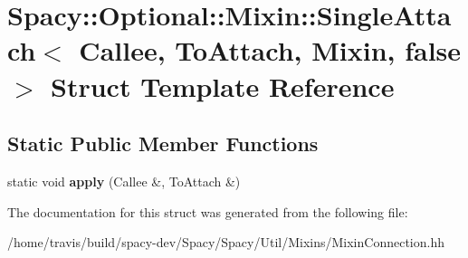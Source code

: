 \hypertarget{structSpacy_1_1Optional_1_1Mixin_1_1SingleAttach_3_01Callee_00_01ToAttach_00_01Mixin_00_01false_01_4}{\section{Spacy\-:\-:Optional\-:\-:Mixin\-:\-:Single\-Attach$<$ Callee, To\-Attach, Mixin, false $>$ Struct Template Reference}
\label{structSpacy_1_1Optional_1_1Mixin_1_1SingleAttach_3_01Callee_00_01ToAttach_00_01Mixin_00_01false_01_4}
}
\subsection*{Static Public Member Functions}
\begin{DoxyCompactItemize}
\item 
\hypertarget{structSpacy_1_1Optional_1_1Mixin_1_1SingleAttach_3_01Callee_00_01ToAttach_00_01Mixin_00_01false_01_4_a92ac7afd81a8e070f3b5da787b0c177e}{static void {\bfseries apply} (Callee \&, To\-Attach \&)}\label{structSpacy_1_1Optional_1_1Mixin_1_1SingleAttach_3_01Callee_00_01ToAttach_00_01Mixin_00_01false_01_4_a92ac7afd81a8e070f3b5da787b0c177e}

\end{DoxyCompactItemize}


The documentation for this struct was generated from the following file\-:\begin{DoxyCompactItemize}
\item 
/home/travis/build/spacy-\/dev/\-Spacy/\-Spacy/\-Util/\-Mixins/Mixin\-Connection.\-hh\end{DoxyCompactItemize}

